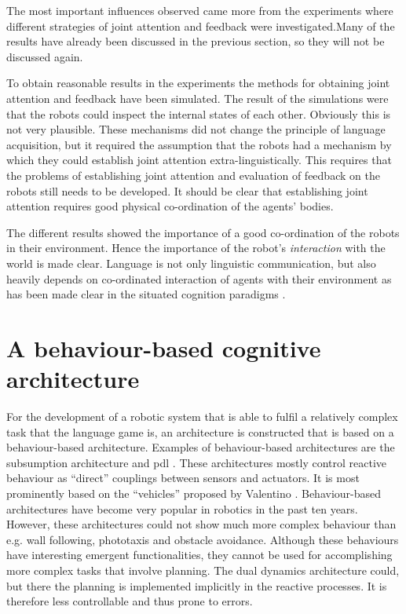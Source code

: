 The most important influences observed came more from the experiments where different strategies of joint attention and feedback were investigated.\linebreak Many of the results have already been discussed in the previous section, so they will not be discussed again.  

To obtain reasonable results in the experiments the methods for obtaining joint attention and feedback have been simulated. The result of the simulations were that the robots could inspect the internal states of each other. Obviously this is not very plausible. These mechanisms did not change the principle of language acquisition, but it required the assumption that the robots had a mechanism by which they could establish joint attention extra-linguistically. This requires that the problems of establishing joint attention and evaluation of feedback on the robots still needs to be developed. It should be clear that establishing joint attention requires good physical co-ordination of the agents' bodies.


The different results showed the importance of a good co-ordination of the robots in their environment. Hence the importance of the robot's {\em interaction} with the world is made clear. Language is not only linguistic communication, but also heavily depends on co-ordinated interaction of agents with their environment as has been made clear in the situated cognition paradigms \citep{clancey:1997}.

\section{A behaviour-based cognitive architecture}

For the development of a robotic system that is able to fulfil a relatively complex task that the language game is, an architecture is constructed that is based on a behaviour-based architecture. Examples of behaviour-based architectures are the subsumption architecture \citep{brooks:1990} and {\sc pdl} \citep{steels:1994b}. These architectures mostly control reactive behaviour as ``direct'' couplings between sensors and actuators. It is most prominently based on the ``vehicles'' proposed by Valentino \citet{braitenberg:1984}. Behaviour-based architectures have become very popular in robotics in the past ten years. However, these architectures could not show much more complex behaviour than e.g. wall following, phototaxis and obstacle avoidance. Although these behaviours have interesting emergent functionalities, they cannot be used for accomplishing more complex tasks that involve planning. The dual dynamics architecture \citep{jaeger:1997} could, but there the planning is implemented implicitly in the reactive processes. It is therefore less controllable and thus prone to errors.


